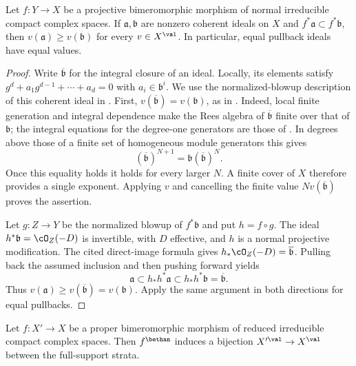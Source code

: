 \begin{lemma}\label{lem:ts-projective-ideal-reflection}
Let $f:Y\to X$ be a projective bimeromorphic morphism of normal
irreducible compact complex spaces. If $\mathfrak a,\mathfrak b$ are
nonzero coherent ideals on $X$ and
$f^*\mathfrak a\subset f^*\mathfrak b$, then
$v(\mathfrak a)\geq v(\mathfrak b)$ for every $v\in X^{\val}$.
In particular, equal pullback ideals have equal values.
\end{lemma}

\begin{proof}
Write $\overline{\mathfrak b}$ for the integral closure of an ideal.
Locally, its elements satisfy
$g^d+a_1g^{d-1}+\cdots+a_d=0$ with $a_i\in\mathfrak b^i$.
We use the normalized-blowup description of this coherent ideal in
\cite[Proposition~2.2.2 and Corollary~2.2.3]{MPTropicalV2}.
First, $v(\overline{\mathfrak b})=v(\mathfrak b)$, as in
\cite[Lemma~2.2.4]{MPTropicalV2}. Indeed, local finite generation and
integral dependence make the Rees algebra of $\overline{\mathfrak b}$
finite over that of $\mathfrak b$; the integral equations for the
degree-one generators are those of \cite[Tag~00H3]{stacks-project}.
In degrees above those of a finite set of homogeneous module generators
this gives
\[
 (\overline{\mathfrak b})^{N+1}
     =\mathfrak b(\overline{\mathfrak b})^N.
\]
Once this equality holds it holds for every larger $N$. A finite cover
of $X$ therefore provides a single exponent. Applying $v$ and cancelling
the finite value $N v(\overline{\mathfrak b})$ proves the assertion.

Let $g:Z\to Y$ be the normalized blowup of $f^*\mathfrak b$ and put
$h=f\circ g$. The ideal $h^*\mathfrak b=\cO_Z(-D)$ is invertible,
with $D$ effective, and $h$ is a normal projective modification.
The cited direct-image formula gives
$h_*\cO_Z(-D)=\overline{\mathfrak b}$. Pulling back the assumed inclusion
and then pushing forward yields
\[
 \mathfrak a\subset h_*h^*\mathfrak a
      \subset h_*h^*\mathfrak b=\overline{\mathfrak b}.
\]
Thus $v(\mathfrak a)\geq v(\overline{\mathfrak b})=v(\mathfrak b)$.
Apply the same argument in both directions for equal pullbacks.
\end{proof}

\begin{proposition}\label{prop:ts-bimeromorphic-valuations}
Let $f:X'\to X$ be a proper bimeromorphic morphism of reduced irreducible
compact complex spaces. Then $f^\bethan$ induces a bijection
$X'^{\val}\to X^{\val}$ between the full-support strata.
\end{proposition}

